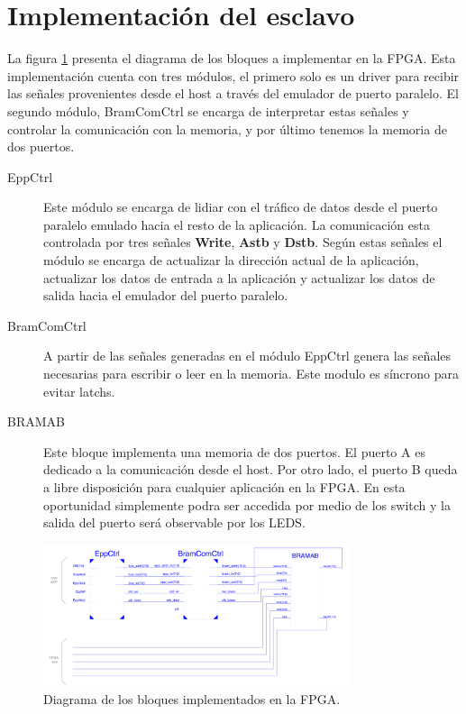 \documentclass[11pt,letterpaper,spanish]{article}
\begin{document}
\section{Implementación del esclavo\label{sec5}}
La figura \ref{sistema_esclavo} presenta el diagrama de los bloques a implementar en la FPGA. Esta implementación cuenta con tres módulos, el primero solo es un driver para recibir las señales provenientes desde el host a través del emulador de puerto paralelo. El segundo módulo, BramComCtrl se encarga de interpretar estas señales y controlar la comunicación con la memoria, y por último tenemos la memoria de dos puertos. 

\begin{description}
\item[EppCtrl] Este módulo se encarga de lidiar con el tráfico de datos desde el puerto paralelo emulado hacia el resto de la aplicación. La comunicación esta controlada por tres señales \textbf{Write}, \textbf{Astb} y \textbf{Dstb}. Según estas señales el módulo se encarga de actualizar la dirección actual de la aplicación, actualizar los datos de entrada a la aplicación y actualizar los datos de salida hacia el emulador del puerto paralelo.
\item[BramComCtrl] A partir de las señales generadas en el módulo EppCtrl genera las señales necesarias para escribir o leer en la memoria. Este modulo es síncrono para evitar latchs.
\item[BRAMAB] Este bloque implementa una memoria de dos puertos. El puerto A es dedicado a la comunicación desde el host. Por otro lado, el puerto B queda a libre disposición para cualquier aplicación en la FPGA. En esta oportunidad simplemente podra ser accedida por medio de los switch y la salida del puerto será observable por los LEDS.
\end{description}


\begin{figure}[h!]
\begin{center}
\includegraphics[width=0.8\textwidth]{figuras/figuras-04.png} 
\caption{\label{sistema_esclavo} Diagrama de los bloques implementados en la FPGA.}
\end{center}
\end{figure}
\end{document}
